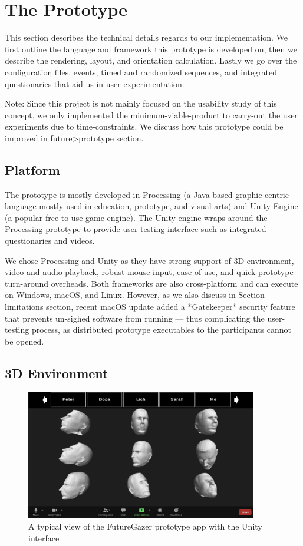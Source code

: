 \section{The Prototype}

This section describes the technical details regards to our implementation. We first outline the language and framework this prototype is developed on, then we describe the rendering, layout, and orientation calculation. Lastly we go over the configuration files, events, timed and randomized sequences, and integrated questionaries that aid us in user-experimentation.

Note: Since this project is not mainly focused on the usability study of this concept, we only implemented the minimum-viable-product to carry-out the user experiments due to time-constraints. We discuss how this prototype could be improved in future>prototype section.

\subsection{Platform}

The prototype is mostly developed in Processing \cite{RN103} (a Java-based graphic-centric language mostly used in education, prototype, and visual arts) and Unity Engine (a popular free-to-use game engine). The Unity engine wraps around the Processing prototype to provide user-testing interface such as integrated questionaries and videos.

We chose Processing and Unity as they have strong support of 3D environment, video and audio playback, robust mouse input, ease-of-use, and quick prototype turn-around overheads. Both frameworks are also cross-platform and can execute on Windows, macOS, and Linux. However, as we also discuss in Section limitations section, recent macOS update added a *Gatekeeper* security feature that prevents un-sighed software from running\cite{RN105} --- thus complicating the user-testing process, as distributed prototype executables to the participants cannot be opened.

\subsection{3D Environment}\label{section:3denv}

\begin{figure}
	\centering
 	\includegraphics[width=0.9\textwidth]{unity.PNG}
	\caption{A typical view of the FutureGazer prototype app with the Unity interface}
	\label{fig:unity}
\end{figure}

